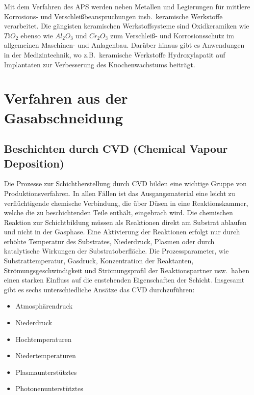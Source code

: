 \documentclass[12pt,a4paper,bibliography=totocnumbered,listof=totocnumbered,fleqn]{scrartcl}
\begin{document}
Mit dem Verfahren des APS werden neben Metallen und Legierungen für mittlere Korrosions- und Verschleißbeanspruchungen insb.\ keramische Werkstoffe verarbeitet.
Die gängisten keramischen Werkstoffsysteme sind Oxidkeramiken wie $TiO_{2}$ ebenso wie $Al_{2}O_{3}$ und $Cr_{2}O_{3}$ zum Verschleiß- und Korrosionsschutz im allgemeinen Maschinen- und Anlagenbau. Darüber hinaus gibt es Anwendungen in der Medizintechnik, wo z.B.\ keramische Werkstoffe Hydroxylapatit auf Implantaten zur Verbesserung des Knochenwachstums beiträgt.

\pagebreak

\section{Verfahren aus der Gasabschneidung}

\subsection{Beschichten durch CVD (Chemical Vapour Deposition)}

Die Prozesse zur Schichtherstellung durch CVD bilden eine wichtige Gruppe von Produktionsverfahren. In allen Fällen ist das Ausgangsmaterial eine leicht zu verflüchtigende chemische Verbindung, die über Düsen in eine Reaktionskammer, welche die zu beschichtenden Teile enthält, eingebrach wird. Die chemischen Reaktion zur Schichtbildung müssen als Reaktionen direkt am Substrat ablaufen und nicht in der Gasphase. Eine Aktivierung der Reaktionen erfolgt nur durch erhöhte Temperatur des Substrates, Niederdruck, Plasmen oder durch katalytische Wirkungen der Substratoberfläche. Die Prozessparameter, wie Substrattemperatur, Gasdruck, Konzentration der Reaktanten, Strömungsgeschwindigkeit und Strömungsprofil der Reaktionspartner usw.\ haben einen starken Einfluss auf die enstehenden Eigenschaften der Schicht. Insgesamt gibt es sechs unterschiedliche Ansätze das CVD durchzuführen:

\begin{itemize}
	\item Atmosphärendruck
	\item Niederdruck
	\item Hochtemperaturen
	\item Niedertemperaturen
	\item Plasmaunterstütztes
	\item Photonenunterstütztes
\end{itemize}
\end{document}
